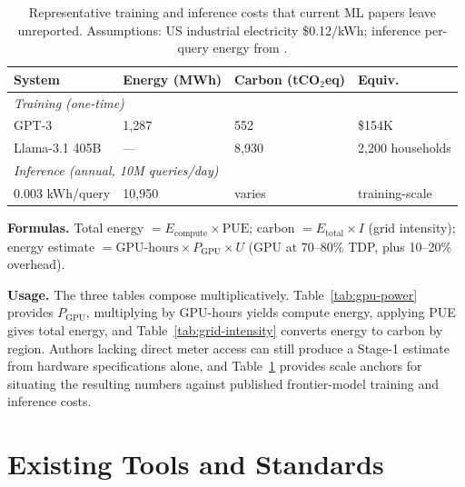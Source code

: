 \documentclass{article}
\theoremstyle{plain}
\theoremstyle{definition}
\theoremstyle{remark}
\begin{document}
\begin{table}[!ht]
\caption{Representative training and inference costs that current ML papers leave unreported. Assumptions: US industrial electricity \$0.12/kWh; inference per-query energy from \cite{luccioni2024power,samsi2023words}.}
\label{tab:cost-quantification}
\begin{center}
\small
\begin{tabular}{p{5.5cm}p{2cm}p{2.5cm}p{3.5cm}}
\toprule
\textbf{System} & \textbf{Energy (MWh)} & \textbf{Carbon (tCO$_2$eq)} & \textbf{Equiv.} \\
\midrule
\multicolumn{4}{l}{\textit{Training (one-time)}} \\
GPT-3 \cite{patterson2021carbon} & 1{,}287 & 552 & \$154K \\
Llama-3.1 405B \cite{dubey2024llama3} & --- & 8{,}930 & 2{,}200 households \\
\midrule
\multicolumn{4}{l}{\textit{Inference (annual, 10M queries/day)}} \\
0.003 kWh/query \cite{luccioni2024power,samsi2023words} & 10{,}950 & varies & training-scale \\
\bottomrule
\end{tabular}
\end{center}
\end{table}

\noindent\textbf{Formulas.} Total energy $= E_{\text{compute}} \times \text{PUE}$; carbon $= E_{\text{total}} \times I$ (grid intensity); energy estimate $= \text{GPU-hours} \times P_{\text{GPU}} \times U$ (GPU at 70--80\% TDP, plus 10--20\% overhead).

\noindent\textbf{Usage.} The three tables compose multiplicatively. Table~\ref{tab:gpu-power} provides $P_{\text{GPU}}$, multiplying by GPU-hours yields compute energy, applying PUE gives total energy, and Table~\ref{tab:grid-intensity} converts energy to carbon by region. Authors lacking direct meter access can still produce a Stage-1 estimate from hardware specifications alone, and Table~\ref{tab:cost-quantification} provides scale anchors for situating the resulting numbers against published frontier-model training and inference costs.

\clearpage
\section{Existing Tools and Standards}
\label{app:tools}
\end{document}
